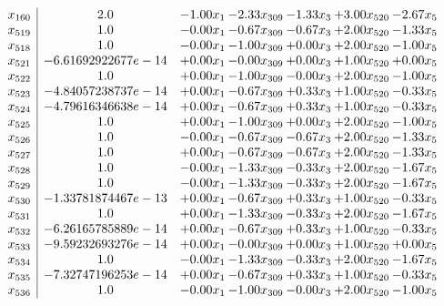 \documentclass[8pt]{article}
\begin{document}
\[\begin{array}{c| c c@{\hskip 2pt} c@{\hskip 2pt} c@{\hskip 2pt} c@{\hskip 2pt} c@{\hskip 2pt} }
 x_{160}   &  2.0 & -1.00 x_{1} & -2.33 x_{309} & -1.33 x_{3} & +  3.00 x_{520} & -2.67 x_{5}\\
 x_{519}   &  1.0 & -0.00 x_{1} & -0.67 x_{309} & -0.67 x_{3} & +  2.00 x_{520} & -1.33 x_{5}\\
 x_{518}   &  1.0 & -0.00 x_{1} & -1.00 x_{309} & +  0.00 x_{3} & +  2.00 x_{520} & -1.00 x_{5}\\
 x_{521}   &  -6.61692922677e-14 & +  0.00 x_{1} & -0.00 x_{309} & +  0.00 x_{3} & +  1.00 x_{520} & +  0.00 x_{5}\\
 x_{522}   &  1.0 & +  0.00 x_{1} & -1.00 x_{309} & -0.00 x_{3} & +  2.00 x_{520} & -1.00 x_{5}\\
 x_{523}   &  -4.84057238737e-14 & +  0.00 x_{1} & -0.67 x_{309} & +  0.33 x_{3} & +  1.00 x_{520} & -0.33 x_{5}\\
 x_{524}   &  -4.79616346638e-14 & +  0.00 x_{1} & -0.67 x_{309} & +  0.33 x_{3} & +  1.00 x_{520} & -0.33 x_{5}\\
 x_{525}   &  1.0 & +  0.00 x_{1} & -1.00 x_{309} & +  0.00 x_{3} & +  2.00 x_{520} & -1.00 x_{5}\\
 x_{526}   &  1.0 & -0.00 x_{1} & -0.67 x_{309} & -0.67 x_{3} & +  2.00 x_{520} & -1.33 x_{5}\\
 x_{527}   &  1.0 & +  0.00 x_{1} & -0.67 x_{309} & -0.67 x_{3} & +  2.00 x_{520} & -1.33 x_{5}\\
 x_{528}   &  1.0 & -0.00 x_{1} & -1.33 x_{309} & -0.33 x_{3} & +  2.00 x_{520} & -1.67 x_{5}\\
 x_{529}   &  1.0 & -0.00 x_{1} & -1.33 x_{309} & -0.33 x_{3} & +  2.00 x_{520} & -1.67 x_{5}\\
 x_{530}   &  -1.33781874467e-13 & +  0.00 x_{1} & -0.67 x_{309} & +  0.33 x_{3} & +  1.00 x_{520} & -0.33 x_{5}\\
 x_{531}   &  1.0 & +  0.00 x_{1} & -1.33 x_{309} & -0.33 x_{3} & +  2.00 x_{520} & -1.67 x_{5}\\
 x_{532}   &  -6.26165785889e-14 & +  0.00 x_{1} & -0.67 x_{309} & +  0.33 x_{3} & +  1.00 x_{520} & -0.33 x_{5}\\
 x_{533}   &  -9.59232693276e-14 & +  0.00 x_{1} & -0.00 x_{309} & +  0.00 x_{3} & +  1.00 x_{520} & +  0.00 x_{5}\\
 x_{534}   &  1.0 & -0.00 x_{1} & -1.33 x_{309} & -0.33 x_{3} & +  2.00 x_{520} & -1.67 x_{5}\\
 x_{535}   &  -7.32747196253e-14 & +  0.00 x_{1} & -0.67 x_{309} & +  0.33 x_{3} & +  1.00 x_{520} & -0.33 x_{5}\\
 x_{536}   &  1.0 & -0.00 x_{1} & -1.00 x_{309} & -0.00 x_{3} & +  2.00 x_{520} & -1.00 x_{5}\\

\end{array}\]
\end{document}
